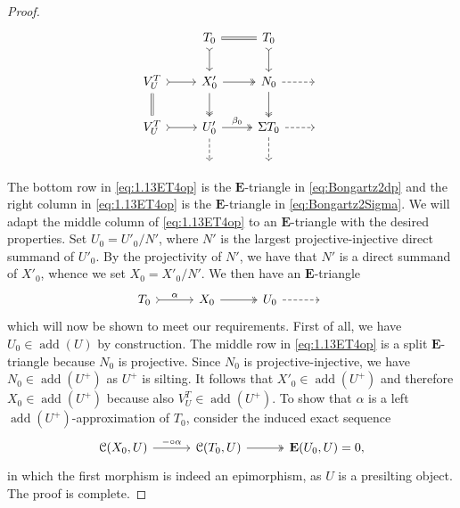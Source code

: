 \documentclass[10pt,twoside, a4paper,reqno]{amsart}
\DeclareMathOperator{\add}{add}
\newcommand{\calC}{\mathcal{C}}
\newcommand{\E}{\mathbf{E}}
\theoremstyle{definition}
\begin{document}
\begin{proof}
		\begin{equation}\label{eq:1.13ET4op}
			\begin{tikzcd}
                                   & T_0 \arrow[r, equal] \arrow[d,tail] & T_0 \arrow[d,tail]                                  &    \\
V^T_U \arrow[r,tail] \arrow[d, equal] & X'_0 \arrow[d,two heads] \arrow[r,two heads]          & N_0 \arrow[d,two heads] \arrow[r, dashed]                & {} \\
V^T_U \arrow[r,tail]                    & U'_0 \arrow[r, two heads,"\beta_0"] \arrow[d, dashed] & \Sigma T_0 \arrow[r, dashed] \arrow[d, dashed] & {} \\
                                   & {}                             & {}                                           &   
\end{tikzcd}
		\end{equation}
		The bottom row in \eqref{eq:1.13ET4op} is the $\E$-triangle in \eqref{eq:Bongartz2dp} and the right column in \eqref{eq:1.13ET4op} is the $\E$-triangle in \eqref{eq:Bongartz2Sigma}. We will adapt the middle column of \eqref{eq:1.13ET4op} to an $\E$-triangle with the desired properties. Set $U_0=U'_0/N'$, where $N'$ is the largest projective-injective direct summand of $U'_0$. By the projectivity of $N'$, we have that $N'$ is a direct summand of $X'_0$, whence we set $X_0=X'_0/N'$. We then have an $\E$-triangle 
		 \begin{equation*}    
		 \begin{tikzcd}[ampersand replacement=\&,column sep=3em]
	T_0  \arrow[r,"\alpha" ,tail] \&  X_0 \arrow[r,two heads] \& U_0 \arrow[r,dashed] \& {}
    \end{tikzcd}
    \end{equation*}
    which will now be shown to meet our requirements. First of all, we have $U_0\in \add(U)$ by construction.
    The middle row in {\eqref{eq:1.13ET4op}} is a split $\E$-triangle because $N_0$ is projective. Since $N_0$ is projective-injective, we have $N_0 \in \add(U^+)$ as $U^+$ is silting. It follows that $X'_0 \in \add(U^+)$ and therefore $X_0 \in \add(U^+)$ because also $V_U^T \in \add (U^+)$. To show that $\alpha$ is a left $\add(U^+)$-approximation of $T_0$, consider the induced exact sequence
     \begin{equation*}    
		 \begin{tikzcd}[ampersand replacement=\&,column sep=3em]
		 \calC(X_0,U) \arrow[r,"-\circ \alpha"] \&  \calC(T_0,U)  \arrow[r,two heads] \& \E(U_0,U)=0,
    \end{tikzcd}
    \end{equation*}
    in which the first morphism is indeed an epimorphism, as $U$ is a presilting object. The proof is complete.
	\end{proof}
\end{document}
